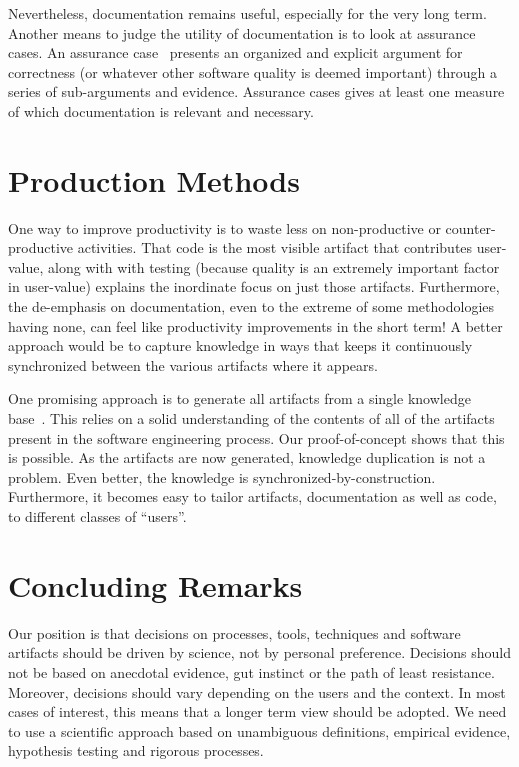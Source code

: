 \documentclass[sigconf, authorversion, nonacm]{acmart}
\begin{document}
Nevertheless, documentation remains useful, especially for the very long
term. Another means to judge the utility of documentation is to look at
assurance cases. An assurance case~\cite{RinehartEtAl2015} presents an
organized and explicit argument for correctness (or whatever other software
quality is deemed important) through a series of sub-arguments and evidence.
Assurance cases gives at least one measure of which documentation is relevant and
necessary.

\section{Production Methods}

One way to improve productivity is to waste less on non-productive or
counter-productive activities. That code is the most visible artifact that
contributes user-value, along with with testing (because quality is an
extremely important factor in user-value) explains the inordinate focus
on just those artifacts. Furthermore, the de-emphasis on documentation, even to
the extreme of some methodologies having none, can feel like productivity
improvements in the short term!  A better approach would be to capture
knowledge in ways that keeps it continuously synchronized between the
various artifacts where it appears.

One promising approach is to generate all artifacts from a single
knowledge base~\cite{SzymczakEtAl2016}.  This relies on a solid understanding
of the contents of all of the artifacts present in the software engineering
process. Our proof-of-concept shows that this is possible. As the artifacts
are now generated, knowledge duplication is not a problem. Even better, the
knowledge is synchronized-by-construction. Furthermore, it becomes easy to
tailor artifacts, documentation as well as code, to different classes of
``users''. 

\section{Concluding Remarks}

Our position is that decisions on processes, tools, techniques and software
artifacts should be driven by science, not by personal preference.  Decisions
should not be based on anecdotal evidence, gut instinct or the path of least
resistance.  Moreover, decisions should vary depending on the users and the
context.  In most cases of interest, this means that a longer term view should
be adopted.  We need to use a scientific approach based on unambiguous
definitions, empirical evidence, hypothesis testing and rigorous processes.
\end{document}
